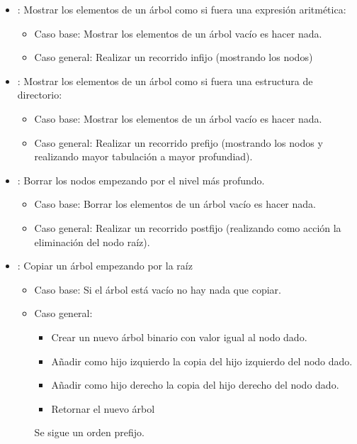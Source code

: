 \begin{itemize}
\item {}: Mostrar los elementos de un árbol como si fuera una expresión aritmética:

\begin{itemize}
\item Caso base: Mostrar los elementos de un árbol vacío es  hacer nada.
\item Caso general: Realizar un recorrido infijo (mostrando los nodos)
\end{itemize}

\item  {}:  Mostrar los elementos de un árbol como si fuera una estructura de directorio:

\begin{itemize}
\item Caso base: Mostrar los elementos de un árbol vacío es  hacer nada.
\item Caso general: Realizar un recorrido prefijo (mostrando los nodos y realizando mayor tabulación a mayor profundiad).
\end{itemize}


\item  {}:  Borrar los nodos empezando por el nivel más profundo.

\begin{itemize}
\item Caso base: Borrar los elementos de un árbol vacío es  hacer nada.
\item Caso general: Realizar un recorrido postfijo (realizando como acción la eliminación del nodo raíz).
\end{itemize}


\item   {}: Copiar un árbol empezando por la raíz

\begin{itemize}
\item Caso base: Si el árbol está vacío no hay nada que copiar.
\item Caso general:  
	\begin{itemize}
	\item Crear un nuevo árbol binario con  valor igual al nodo dado.
	\item Añadir como hijo izquierdo la copia del hijo izquierdo del nodo dado.
	\item Añadir como hijo derecho la copia del hijo derecho del nodo dado.
	\item Retornar el nuevo árbol
	\end{itemize}
	Se sigue un orden prefijo.
\end{itemize}



\end{itemize}
